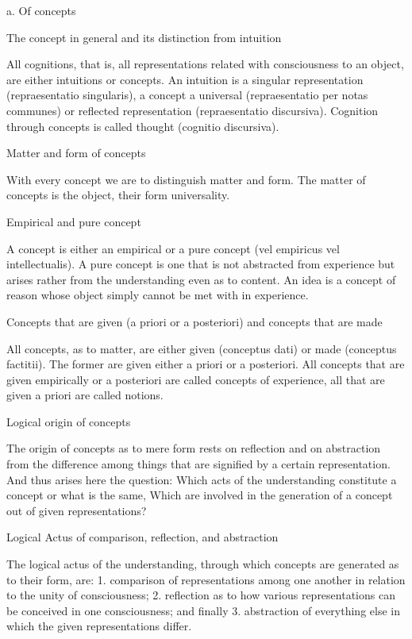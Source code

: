 a. Of concepts

The concept in general and its distinction from intuition

    All cognitions, that is,
    all representations related with consciousness to an object,
    are either intuitions or concepts.
    An intuition is a singular representation (repraesentatio singularis),
    a concept a universal (repraesentatio per notas communes)
    or reflected representation (repraesentatio discursiva).
    Cognition through concepts is called thought (cognitio discursiva).

Matter and form of concepts

    With every concept we are to distinguish matter and form.
    The matter of concepts is the object,
    their form universality.

Empirical and pure concept

    A concept is either an empirical or a pure concept
    (vel empiricus vel intellectualis).
    A pure concept is one that is not abstracted from experience
    but arises rather from the understanding even as to content.
    An idea is a concept of reason whose object
    simply cannot be met with in experience.

Concepts that are given (a priori or a posteriori)
and concepts that are made

    All concepts, as to matter, are either
    given (conceptus dati) or made (conceptus factitii).
    The former are given either a priori or a posteriori.
    All concepts that are given empirically or a posteriori
    are called concepts of experience,
    all that are given a priori are called notions.

Logical origin of concepts

    The origin of concepts as to mere form rests on reflection
    and on abstraction from the difference among things
    that are signified by a certain representation.
    And thus arises here the question:
    Which acts of the understanding constitute a concept
    or what is the same,
    Which are involved in the generation of a concept
    out of given representations?

Logical Actus of comparison, reflection, and abstraction

    The logical actus of the understanding,
    through which concepts are generated as to their form, are:
    1.  comparison of representations among one another
        in relation to the unity of consciousness;
    2.  reflection as to how various representations can
        be conceived in one consciousness; and finally
    3.  abstraction of everything else
        in which the given representations differ.


